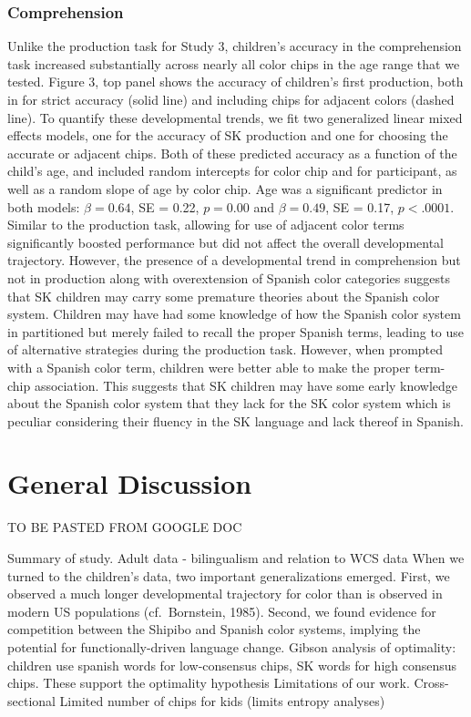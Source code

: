 \documentclass[
  english,
  ,man,floatsintext]{apa6}
\begin{document}
\hypertarget{comprehension-1}{%
\subsubsection{Comprehension}\label{comprehension-1}}

Unlike the production task for Study 3, children's accuracy in the comprehension task increased substantially across nearly all color chips in the age range that we tested. Figure 3, top panel shows the accuracy of children's first production, both in for strict accuracy (solid line) and including chips for adjacent colors (dashed line). To quantify these developmental trends, we fit two generalized linear mixed effects models, one for the accuracy of SK production and one for choosing the accurate or adjacent chips. Both of these predicted accuracy as a function of the child's age, and included random intercepts for color chip and for participant, as well as a random slope of age by color chip. Age was a significant predictor in both models: \(\beta = 0.64\), SE = 0.22, \(p = 0.00\) and \(\beta = 0.49\), SE = 0.17, \(p < .0001\).
Similar to the production task, allowing for use of adjacent color terms significantly boosted performance but did not affect the overall developmental trajectory. However, the presence of a developmental trend in comprehension but not in production along with overextension of Spanish color categories suggests that SK children may carry some premature theories about the Spanish color system. Children may have had some knowledge of how the Spanish color system in partitioned but merely failed to recall the proper Spanish terms, leading to use of alternative strategies during the production task. However, when prompted with a Spanish color term, children were better able to make the proper term-chip association. This suggests that SK children may have some early knowledge about the Spanish color system that they lack for the SK color system which is peculiar considering their fluency in the SK language and lack thereof in Spanish.

\hypertarget{general-discussion}{%
\section{General Discussion}\label{general-discussion}}

TO BE PASTED FROM GOOGLE DOC

Summary of study.
Adult data - bilingualism and relation to WCS data
When we turned to the children's data, two important generalizations emerged. First, we observed a much longer developmental trajectory for color than is observed in modern US populations (cf.~Bornstein, 1985).
Second, we found evidence for competition between the Shipibo and Spanish color systems, implying the potential for functionally-driven language change.
Gibson analysis of optimality: children use spanish words for low-consensus chips, SK words for high consensus chips. These support the optimality hypothesis
Limitations of our work.
Cross-sectional
Limited number of chips for kids (limits entropy analyses)
\end{document}
